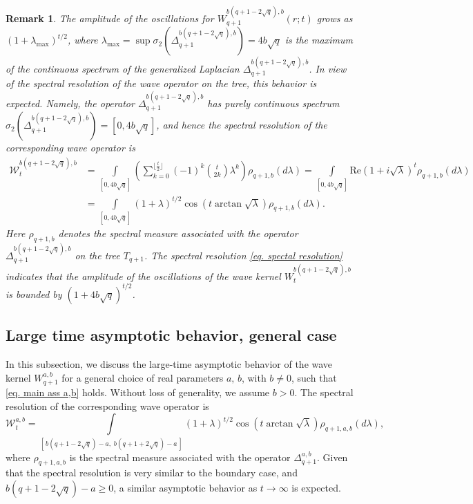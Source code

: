 \documentclass[12pt]{amsart}
\numberwithin{equation}{section}
\theoremstyle{boldremark}
\newtheorem{remark}[theorem]{Remark}
\begin{document}
\begin{remark}
    The amplitude of the oscillations for $W_{q+1}^{b(q+1-2\sqrt{q}),b}(r;t)$ grows as $(1+\lambda_{\max})^{t/2}$, where $\lambda_{\max} =\sup\sigma_2(\Delta_{q+1}^{b(q+1-2\sqrt{q}),b}) =4b\sqrt{q}$ is the maximum of the continuous spectrum of the generalized Laplacian $\Delta_{q+1}^{b(q+1-2\sqrt{q}),b}$. In view of the spectral resolution of the wave operator on the tree, this behavior is expected. Namely, the operator $\Delta_{q+1}^{b(q+1-2\sqrt{q}),b}$ has purely continuous spectrum $\sigma_2(\Delta_{q+1}^{b(q+1-2\sqrt{q}),b})=[0, 4b\sqrt{q}]$, and hence the spectral resolution of the corresponding wave operator is
    \begin{align} \nonumber
    \mathcal{W}_t^{b(q+1-2\sqrt{q}),b}&=\int\limits_{[0, 4b\sqrt{q}]}\left(\sum_{k=0}^{\lfloor\frac{t}{2}\rfloor} (-1)^k\binom{t}{2k}\lambda^k\right)\rho_{q+1,b}(d\lambda)=\int\limits_{[0, 4b\sqrt{q}]}\mathrm{Re}\left( 1+i\sqrt{\lambda} \right)^t \rho_{q+1,b}(d\lambda)\\
    &=\int\limits_{[0, 4b\sqrt{q}]}\left( 1+\lambda \right)^{t/2} \cos(t\arctan\sqrt{\lambda})\rho_{q+1,b}(d\lambda).\label{eq. spectal resolution}
    \end{align}
Here $\rho_{q+1,b}$ denotes the spectral measure associated with the operator $\Delta_{q+1}^{b(q+1-2\sqrt{q}),b}$ on the tree $T_{q+1}$. The spectral resolution \eqref{eq. spectal resolution} indicates that the amplitude of the oscillations of the wave kernel $W_{t}^{b(q+1-2\sqrt{q}),b}$ is bounded by $(1+4b\sqrt{q})^{t/2}$.
\end{remark}

\subsection{Large time asymptotic behavior, general case}

In this subsection, we discuss the large-time asymptotic behavior of the wave kernel $W_{q+1}^{a,b}$ for a general choice of real parameters $a,\,b$, with $b\neq 0$, such that \eqref{eq. main ass a,b} holds. Without loss of generality, we assume $b>0$. The spectral resolution of the corresponding wave operator is
\begin{equation}\label{eq. spectral gen}
\mathcal{W}_t^{a,b}=\int\limits_{[\, b(q+1-2\sqrt{q})-a,\; b(q+1+2\sqrt{q})-a \,]}\left( 1+\lambda \right)^{t/2}\cos(t\arctan\sqrt{\lambda}) \rho_{q+1,a,b}(d\lambda),
\end{equation}
where $\rho_{q+1,a,b}$ is the spectral measure associated with the operator $\Delta_{q+1}^{a,b}$. Given that the spectral resolution is very similar to the boundary case, and $b(q+1-2\sqrt{q})-a\geq 0$, a similar asymptotic behavior as $t\to\infty$ is expected.
\end{document}
